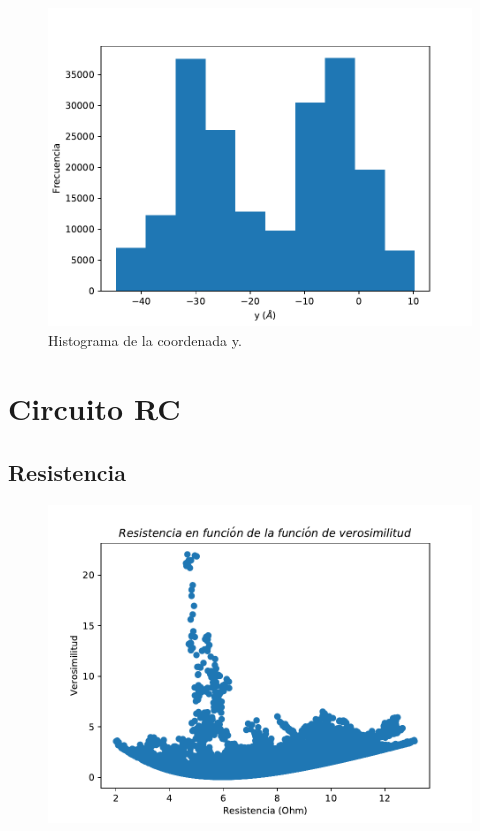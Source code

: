 \documentclass[12pt,letterpaper]{article}
\begin{document}
\begin{figure}[H]
\includegraphics{y1_hist.pdf}
\caption{Histograma de la coordenada y.}
\centering
\end{figure}

\section{Circuito RC}

\subsection*{Resistencia}
\begin{figure}[H]
\includegraphics{r_verosimilitud.pdf}
\centering
\end{figure}
\end{document}
